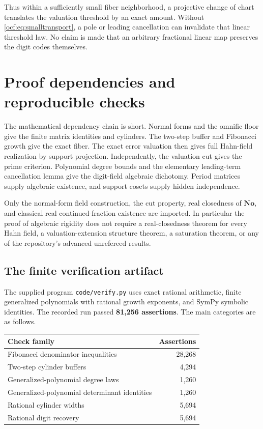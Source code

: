 \documentclass[11pt,a4paper]{article}
\numberwithin{equation}{section}
\theoremstyle{definition}
\theoremstyle{remark}
\newcommand{\No}{\mathbf{No}}
\begin{document}
Thus within a sufficiently small fiber neighborhood, a projective change
of chart translates the valuation threshold by an exact amount. Without
\eqref{ocf:eq:smalltransport}, a pole or leading cancellation can invalidate
that linear threshold law. No claim is made that an arbitrary fractional
linear map preserves the digit codes themselves.

\section{Proof dependencies and reproducible checks}
\label{ocf:sec:verification}

The mathematical dependency chain is short. Normal forms and the omnific
floor give the finite matrix identities and cylinders. The two-step buffer
and Fibonacci growth give the exact fiber. The exact error valuation then
gives full Hahn-field realization by support projection. Independently,
the valuation cut gives the prime criterion. Polynomial degree bounds and
the elementary leading-term cancellation lemma give the digit-field
algebraic dichotomy. Period matrices supply algebraic existence, and
support cosets supply hidden independence.

Only the normal-form field construction, the cut property, real
closedness of $\No$, and classical real continued-fraction existence are
imported. In particular the proof of algebraic rigidity does not require
a real-closedness theorem for every Hahn field, a valuation-extension
structure theorem, a saturation theorem, or any of the repository's
advanced unrefereed results.

\subsection{The finite verification artifact}\label{ocf:sub:artifact}

The supplied program \texttt{code/verify.py} uses exact rational arithmetic,
finite generalized polynomials with rational growth exponents, and SymPy
symbolic identities. The recorded run passed \textbf{81,256 assertions}.
The main categories are as follows.

\begin{center}
\begin{tabular}{@{}lr@{}}
\toprule
Check family & Assertions\\
\midrule
Fibonacci denominator inequalities & 28,268\\
Two-step cylinder buffers & 4,294\\
Generalized-polynomial degree laws & 1,260\\
Generalized-polynomial determinant identities & 1,260\\
Rational cylinder widths & 5,694\\
Rational digit recovery & 5,694\\
\bottomrule
\end{tabular}
\end{center}
\end{document}
